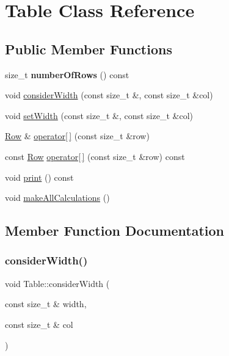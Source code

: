 \hypertarget{classTable}{}\section{Table Class Reference}
\label{classTable}
\subsection*{Public Member Functions}
\begin{DoxyCompactItemize}
\item 
\mbox{\label{classTable_a80c70bde6e2466bd31de1c3828fb3c13}} 
size\+\_\+t {\bfseries number\+Of\+Rows} () const
\item 
void \hyperlink{classTable_a5033ca5270ef016fef222fd3d01ca869}{consider\+Width} (const size\+\_\+t \&, const size\+\_\+t \&col)
\item 
void \hyperlink{classTable_a25434e9c7466b30fd5274ae1e2b90340}{set\+Width} (const size\+\_\+t \&, const size\+\_\+t \&col)
\item 
\hyperlink{classRow}{Row} \& \hyperlink{classTable_a87e55e477438afdaa491965aee7a8be2}{operator\mbox{[}$\,$\mbox{]}} (const size\+\_\+t \&row)
\item 
const \hyperlink{classRow}{Row} \hyperlink{classTable_a8bcbf5400584f857754e0bc0c97a63ec}{operator\mbox{[}$\,$\mbox{]}} (const size\+\_\+t \&row) const
\item 
void \hyperlink{classTable_aa6531f07b1b9b1690ba81e6c27d7b47e}{print} () const
\item 
void \hyperlink{classTable_a3ea36998494f2f1ea0e7d2d4add7b7d7}{make\+All\+Calculations} ()
\end{DoxyCompactItemize}


\subsection{Member Function Documentation}
\mbox{\label{classTable_a5033ca5270ef016fef222fd3d01ca869}} 
\subsubsection{\texorpdfstring{consider\+Width()}{considerWidth()}}
{\footnotesize\ttfamily void Table\+::consider\+Width (\begin{DoxyParamCaption}\item[{const size\+\_\+t \&}]{width,  }\item[{const size\+\_\+t \&}]{col }\end{DoxyParamCaption})}

